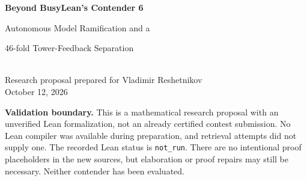\documentclass[11pt,letterpaper]{article}
\theoremstyle{definition}
\newcommand{\Iter}[2]{#1^{[#2]}}
\newcommand{\code}[1]{\texttt{#1}}
\begin{document}
\begin{center}
{\Large\bfseries Beyond BusyLean's Contender 6}\\[6pt]
{\large Autonomous Model Ramification and a\par
46-fold Tower-Feedback Separation}\\[12pt]
Research proposal prepared for Vladimir Reshetnikov\\
October 12, 2026
\end{center}

\begin{abstract}
We propose a closed, computable Lean definition that strengthens the current
BusyLean contender by changing what the object language can interpret, not
merely by enlarging its numerical argument. A fixed seven-slot interface makes
lower reflection operators, forest recursors, and program-generated tree
schedules available to higher interpretations. The interface closes under all
finite model ramifications, and is then ramified structurally along a tree
produced by the strengthened language itself. A depth-11 program provides a
uniform comparison certificate, valid for every external oracle. If $C_6$ is
the adopted contender at the pinned repository revision, and
$\Theta(x)=(y\mapsto 2^y)^{[x+1]}(x+1)$, the construction satisfies
\[
                    \boxed{\Iter{\Theta}{46}(C_6)<C_7.}
\]
We also prove an interpretation-relative cofinality theorem for model
ramification along definable trees, and a diagonal non-majorization theorem.
These results require no assigned proof-theoretic ordinal. The package
contains detailed mathematical proofs, new Lean definitions and 84 theorem
scripts, exact baseline source copies, and a guarded reference interpreter.
The new Lean sources have not been compiler-checked in this environment;
1,830 finite reference-model assertions passed, but kernel certification,
axiom closure, and contest build-time compliance remain unverified.
\end{abstract}

\begin{statusbox}
\textbf{Validation boundary.} This is a mathematical research proposal with an
unverified Lean formalization, not an already certified contest submission.
No Lean compiler was available during preparation, and retrieval attempts did
not supply one. The recorded Lean status is \code{not\_run}. There are no
intentional proof placeholders in the new sources, but elaboration or proof
repairs may still be necessary. Neither contender has been evaluated.
\end{statusbox}
\end{document}
